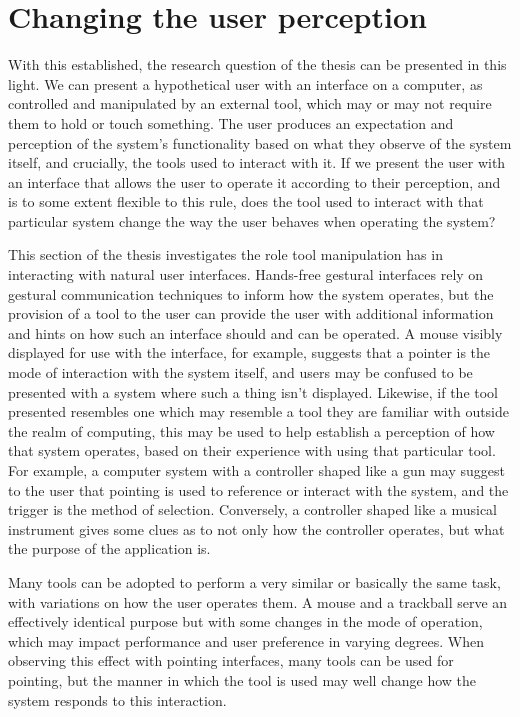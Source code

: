 \section{Changing the user perception}

With this established, the research question of the thesis can be presented in this light. We can present a hypothetical user with an interface on a computer, as controlled and manipulated by an external tool, which may or may not require them to hold or touch something. The user produces an expectation and perception of the system's functionality based on what they observe of the system itself, and crucially, the tools used to interact with it. If we present the user with an interface that allows the user to operate it according to their perception, and is to some extent flexible to this rule, does the tool used to interact with that particular system change the way the user behaves when operating the system?

This section of the thesis investigates the role tool manipulation has in interacting with natural user interfaces. Hands-free gestural interfaces rely on gestural communication techniques to inform how the system operates, but the provision of a tool to the user can provide the user with additional information and hints on how such an interface should and can be operated. A mouse visibly displayed for use with the interface, for example, suggests that a pointer is the mode of interaction with the system itself, and users may be confused to be presented with a system where such a thing isn't displayed. Likewise, if the tool presented resembles one which may resemble a tool they are familiar with outside the realm of computing, this may be used to help establish a perception of how that system operates, based on their experience with using that particular tool. For example, a computer system with a controller shaped like a gun may suggest to the user that pointing is used to reference or interact with the system, and the trigger is the method of selection. Conversely, a controller shaped like a musical instrument gives some clues as to not only how the controller operates, but what the purpose of the application is.

Many tools can be adopted to perform a very similar or basically the same task, with variations on how the user operates them. A mouse and a trackball serve an effectively identical purpose but with some changes in the mode of operation, which may impact performance and user preference in varying degrees. When observing this effect with pointing interfaces, many tools can be used for pointing, but the manner in which the tool is used may well change how the system responds to this interaction. 

